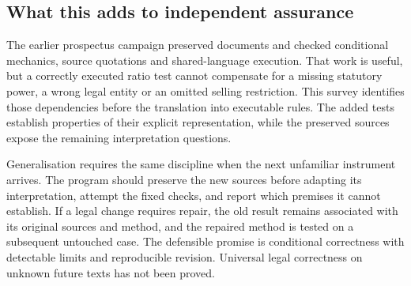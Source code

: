 \subsection{What this adds to independent assurance}

The earlier prospectus campaign preserved documents and checked conditional
mechanics, source quotations and shared-language execution. That work is useful,
but a correctly executed ratio test cannot compensate for a missing statutory
power, a wrong legal entity or an omitted selling restriction. This survey
identifies those dependencies before the translation into executable rules.
The added tests establish properties of their explicit representation, while
the preserved sources expose the remaining interpretation questions.

Generalisation requires the same discipline when the next unfamiliar instrument
arrives. The program should preserve the new sources before adapting its
interpretation, attempt the fixed checks, and report which premises it cannot
establish. If a legal change requires repair, the old result remains associated
with its original sources and method, and the repaired method is tested on a
subsequent untouched case. The defensible promise is conditional correctness
with detectable limits and reproducible revision. Universal legal correctness
on unknown future texts has not been proved.
